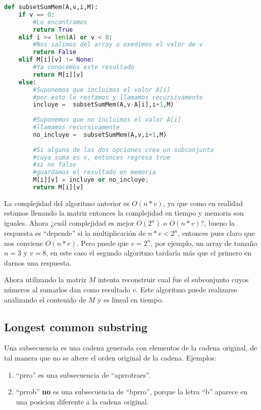 \begin{lstlisting}[language=Python, caption=Subset sum programacion dinamica]
def subsetSumMem(A,v,i,M):
    if v == 0:
        #Lo encontramos
        return True
    elif i >= len(A) or v < 0:
        #Nos salimos del array o exedimos el valor de v
        return False
    elif M[i][v] != None:
        #Ya conocemos este resultado
        return M[i][v]
    else:
        #Suponemos que incluimos el valor A[i]
        #por esto lo restamos y llamamos recursivamente
        incluye =  subsetSumMem(A,v-A[i],i+1,M)
        
        #Suponemos que no incluimos el valor A[i]
        #llamamos recursivamente
        no_incluye =  subsetSumMem(A,v,i+1,M)
        
        #Si alguna de las dos opciones crea un subconjunto
        #cuya suma es v, entonces regresa true
        #si no false
        #guardamos el resultado en memoria
        M[i][v] = incluye or no_incluye;
        return M[i][v] 
\end{lstlisting}
 
 La complejidad del algoritmo anterior es $O(n*v)$, ya que como en realidad estamos llenando la matriz entonces la complejidad en tiempo y memoria son iguales. Ahora ¿cuál complejidad es mejor $O(2^n)$ o $O(n*v)$?, bueno la respuesta es ``depende'' si la multiplicación de $n*v < 2^n$, entonces pues claro que nos conviene $O(n*v)$. Pero puede que $v=2^n$, por ejemplo, un array de tamaño $n=3$ y $v=8$, en este caso el segundo algoritmo tardaría más que el primero en darnos una respuesta. 
 
 Ahora utilizando la matriz $M$ intenta reconstruir cual fue el subconjunto cuyos números al sumarlos dan como resultado $v$. Este algoritmo puede realizarse analizando el contenido de $M$ y es lineal en tiempo.
 
 \subsection{Longest common substring}
 
 Una subsecuencia es una cadena generada con elementos de la cadena original, de tal manera que no se altere el orden original de la cadena. Ejemplos:
 
 \begin{enumerate}
     \item ``prro'' es una subsecuencia de ``aprrotraes''.
     \item ``prrob'' \textbf{no} es una subsecuencia de ``bprro'', porque la letra ``b'' aparece en una posicion diferente a la cadena original.
 \end{enumerate}
 

